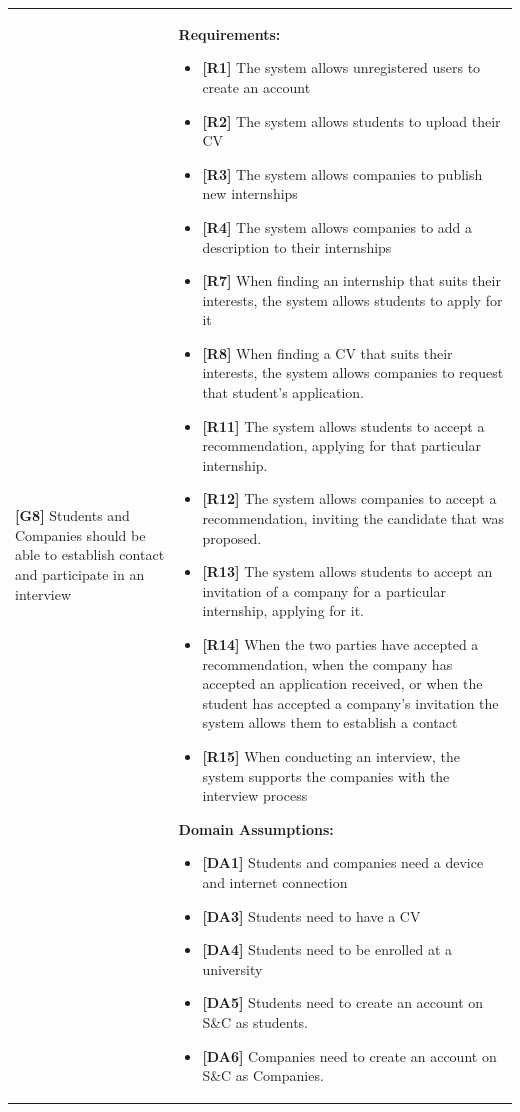 \begin{longtable}{|p{}|p{}|}
\textbf{[G8]} Students and Companies should be able to establish contact and participate in an interview 
& 
\textbf{Requirements:}
\begin{itemize}
    \item \textbf{[R1]} The system allows unregistered users to create an account
    \item \textbf{[R2]} The system allows students to upload their CV
    \item \textbf{[R3]} The system allows companies to publish new internships
    \item \textbf{[R4]} The system allows companies to add a description to their internships
    \item \textbf{[R7]} When finding an internship that suits their interests, the system allows students to apply for it
    \item \textbf{[R8]} When finding a CV that suits their interests, the system allows companies to request that student's application.
    \item  \textbf{[R11]} The system allows students to accept a recommendation, applying for that particular internship.
    \item  \textbf{[R12]} The system allows companies to accept a recommendation, inviting the candidate that was proposed.
    \item \textbf{[R13]} The system allows students to accept an invitation of a company for a particular internship, applying for it.
    \item \textbf{[R14]} When the two parties have accepted a recommendation, when the company has accepted an application received, or when the student has accepted a company's invitation the system allows them to establish a contact
    \item \textbf{[R15]} When conducting an interview, the system supports the companies with the interview process 
\end{itemize}
\textbf{Domain Assumptions:}
\begin{itemize}
    \item \textbf{[DA1]} Students and companies need a device and internet connection
     \item \textbf{[DA3]} Students need to have a CV
     \item \textbf{[DA4]} Students need to be enrolled at a university
    \item \textbf{[DA5]} Students need to create an account on S\&C as students.
    \item \textbf{[DA6]} Companies need to create an account on S\&C as Companies.

\end{itemize}
\end{longtable}
